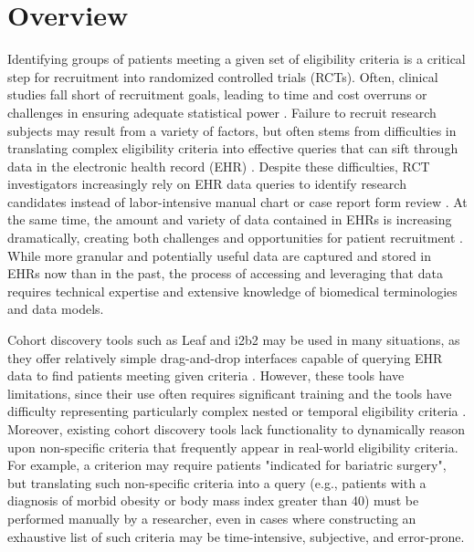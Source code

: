 \documentclass[../main.tex]{subfiles}
\begin{document}
\section{Overview}

Identifying groups of patients meeting a given set of eligibility criteria is a critical step for recruitment into randomized controlled trials (RCTs). Often, clinical studies fall short of recruitment goals, leading to time and cost overruns or  challenges in ensuring adequate statistical power \cite{gul2010clinical, adams2015barriers}. Failure to recruit research subjects may result from a variety of factors, but often stems from difficulties in translating complex eligibility criteria into effective queries that can sift through data  in the electronic health record (EHR) \cite{wang2017classifying}. Despite these difficulties, RCT investigators  increasingly rely on EHR data queries to  identify research candidates instead of labor-intensive manual chart or case report form review \cite{cowie2017electronic}. At the same time, the amount and variety of data contained in EHRs is increasing dramatically, creating both challenges and opportunities for patient recruitment \cite{lee2017medical}. While more granular and potentially useful data are captured and stored in EHRs now than in the past, the process of accessing and leveraging that data requires technical expertise and extensive knowledge of biomedical terminologies and data models. 

Cohort discovery tools such as Leaf \cite{dobbins2019leaf} and i2b2 \cite{murphy2010serving} may be used in many situations, as they offer relatively simple drag-and-drop interfaces capable of querying EHR data to find patients meeting given criteria \cite{johnson2014use}.  However, these tools have limitations, since their use often requires significant training  and the tools have difficulty representing particularly complex nested or temporal eligibility criteria \cite{deshmukh2009evaluating}. Moreover, existing cohort discovery tools lack functionality to dynamically reason upon non-specific criteria that frequently appear in real-world eligibility criteria. For example, a criterion may require patients "indicated for bariatric surgery", but translating such non-specific criteria into a query (e.g., patients with a diagnosis of morbid obesity or body mass index greater than 40) must be performed manually by a researcher, even in cases where constructing an exhaustive list of such criteria may be time-intensive, subjective, and error-prone. 
\end{document}
